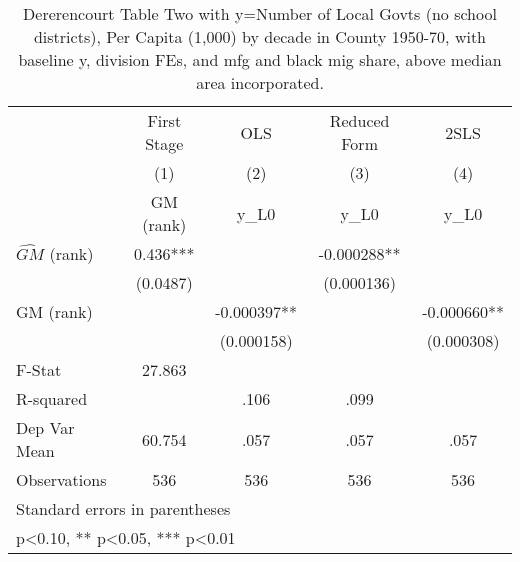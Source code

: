 \begin{table}[htbp]\centering
\def\sym#1{\ifmmode^{#1}\else\(^{#1}\)\fi}
\caption{Dererencourt Table Two with y=Number of Local Govts (no school districts), Per Capita (1,000) by decade in County 1950-70, with baseline y, division FEs, and mfg and black mig share, above median area incorporated.}
\begin{tabular}{l*{4}{c}}
\toprule
                    & First Stage   &         OLS   &Reduced Form   &        2SLS   \\
                    &\multicolumn{1}{c}{(1)}&\multicolumn{1}{c}{(2)}&\multicolumn{1}{c}{(3)}&\multicolumn{1}{c}{(4)}\\
                    &\multicolumn{1}{c}{GM  (rank)}&\multicolumn{1}{c}{y\_L0}&\multicolumn{1}{c}{y\_L0}&\multicolumn{1}{c}{y\_L0}\\
\midrule
$\hat{GM}$ (rank)   &       0.436***&               &   -0.000288** &               \\
                    &    (0.0487)   &               &  (0.000136)   &               \\
\addlinespace
GM  (rank)          &               &   -0.000397** &               &   -0.000660** \\
                    &               &  (0.000158)   &               &  (0.000308)   \\
\midrule
F-Stat              &      27.863   &               &               &               \\
R-squared           &               &        .106   &        .099   &               \\
Dep Var Mean        &      60.754   &        .057   &        .057   &        .057   \\
Observations        &         536   &         536   &         536   &         536   \\
\bottomrule
\multicolumn{5}{l}{\footnotesize Standard errors in parentheses}\\
\multicolumn{5}{l}{\footnotesize * p<0.10, ** p<0.05, *** p<0.01}\\
\end{tabular}
\end{table}
